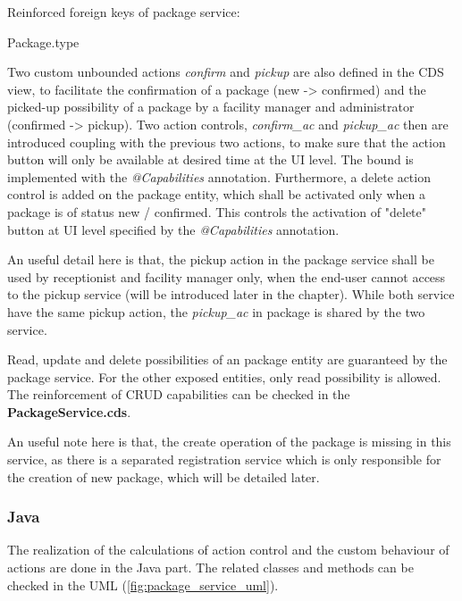 \bigskip
Reinforced foreign keys of package service:
\begin{compactenum}
	\item Package.type
\end{compactenum}

\bigskip
Two custom unbounded actions \textit{confirm} and \textit{pickup} are also defined in the CDS view, to facilitate the confirmation of a package (new -> confirmed) and the picked-up possibility of a package by a facility manager and administrator (confirmed -> pickup). Two action controls, \textit{confirm\_ac} and \textit{pickup\_ac} then are introduced coupling with the previous two actions, to make sure that the action button will only be available at desired time at the UI level. The bound is implemented with the \textit{@Capabilities} annotation. Furthermore, a delete action control is added on the package entity, which shall be activated only when a package is of status new / confirmed. This controls the activation of "delete" button at UI level specified by the \textit{@Capabilities} annotation. 

\bigskip
An useful detail here is that, the pickup action in the package service shall be used by receptionist and facility manager only, when the end-user cannot access to the pickup service (will be introduced later in the chapter). While both service have the same pickup action, the \textit{pickup\_ac} in package is shared by the two service.

\bigskip
Read, update and delete possibilities of an package entity are guaranteed by the package service. For the other exposed entities, only read possibility is allowed. The reinforcement of CRUD capabilities can be checked in the \textbf{PackageService.cds}. 

\bigskip
An useful note here is that, the create operation of the package is missing in this service, as there is a separated registration service which is only responsible for the creation of new package, which will be detailed later.

\subsubsection{Java}

The realization of the calculations of action control and the custom behaviour of actions are done in the Java part. The related classes and methods can be checked in the UML (\autoref{fig:package_service_uml}). 

